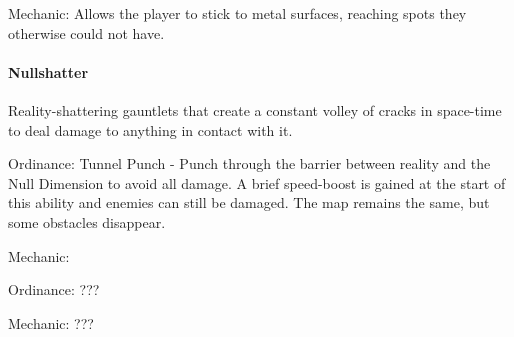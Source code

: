 \documentclass[../Main.tex]{subfiles}
\begin{document}
Mechanic: Allows the player to stick to metal surfaces, reaching spots they otherwise could not have. 

\paragraph{Nullshatter}

Reality-shattering gauntlets that create a constant volley of cracks in space-time to deal damage to anything in contact with it.

Ordinance: Tunnel Punch - Punch through the barrier between reality and the Null Dimension to avoid all damage. A brief speed-boost is gained at the start of this ability and enemies can still be damaged. The map remains the same, but some obstacles disappear.

Mechanic: 

Ordinance: ???

Mechanic: ??? 
\end{document}
